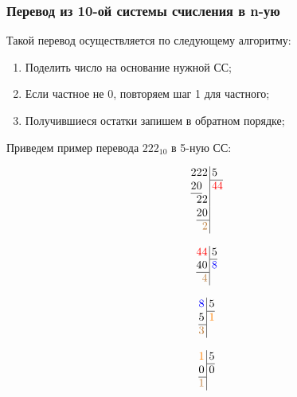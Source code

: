 \documentclass[12pt]{article}
\theoremstyle{problem_style}
\begin{document}
\subsubsection{Перевод из 10-ой системы счисления в n-ую}\label{sec:base_10_to_base_n}
Такой перевод осуществляется по следующему алгоритму:
\begin{enumerate}
    \item Поделить число на основание нужной СС;
    \item Если частное не 0, повторяем шаг 1 для частного;
    \item Получившиеся остатки запишем в обратном порядке;
\end{enumerate}
Приведем пример перевода $222_{10}$ в 5-ную СС:
\begin{figure}[h!]
    \begin{minipage}{0.18\linewidth}
    $$\arraycolsep=0.01em
    \begin{array}{rrr@{\,}r|l}
    2&2&2&&\,5\\
    \cline{5-5}
    2&0&&&\,\textcolor{red}{44}\\
    \cline{1-2}
    &2&2&&\\
    &2&0&&\\
    \cline{2-3}
    &&\textcolor{brown}{2}&&\\
    \end{array}$$
    \end{minipage}
    \hspace{1cm}
    \begin{minipage}{0.18\linewidth}
    $$\arraycolsep=0.01em
    \begin{array}{rr@{\,}r|l}
    \textcolor{red}{4}&\textcolor{red}{4}&&\,5\\
    \cline{4-4}
    4&0&&\,\textcolor{blue}{8}\\
    \cline{1-2}
    &\textcolor{brown}{4}&&\\
    \end{array}$$
    \end{minipage}
    \hspace{1cm}
    \begin{minipage}{0.18\linewidth}
    $$\arraycolsep=0.01em
    \begin{array}{r@{\,}r|l}
    \textcolor{blue}{8}&&\,5\\
    \cline{3-3}
    5&&\,\textcolor{orange}{1}\\
    \cline{1-1}
    \textcolor{brown}{3}&&\\
    \end{array}$$
    \end{minipage}
    \hspace{1cm}
    \begin{minipage}{0.18\linewidth}
    $$\arraycolsep=0.01em
    \begin{array}{r@{\,}r|l}
    \textcolor{orange}{1}&&\,5\\
    \cline{3-3}
    0&&\,0\\
    \cline{1-1}
    \textcolor{brown}{1}&&\\
    \end{array}$$
    \end{minipage}
\end{figure}\\
\end{document}

